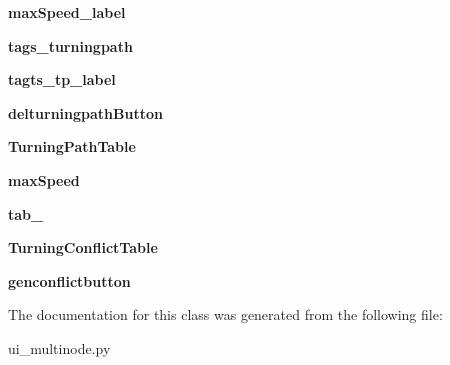 \begin{DoxyCompactItemize}
\item 
\hypertarget{class_sim_g_d_c_1_1ui__multinode_1_1_ui___multi_node_a846224a578369f377c62b30573e400e6}{}{\bfseries max\+Speed\+\_\+label}\label{class_sim_g_d_c_1_1ui__multinode_1_1_ui___multi_node_a846224a578369f377c62b30573e400e6}

\item 
\hypertarget{class_sim_g_d_c_1_1ui__multinode_1_1_ui___multi_node_afd095a589dac3d09e7a9cd0e7f3eed47}{}{\bfseries tags\+\_\+turningpath}\label{class_sim_g_d_c_1_1ui__multinode_1_1_ui___multi_node_afd095a589dac3d09e7a9cd0e7f3eed47}

\item 
\hypertarget{class_sim_g_d_c_1_1ui__multinode_1_1_ui___multi_node_a3b91ce20fbacbe119a208f5d817f9761}{}{\bfseries tagts\+\_\+tp\+\_\+label}\label{class_sim_g_d_c_1_1ui__multinode_1_1_ui___multi_node_a3b91ce20fbacbe119a208f5d817f9761}

\item 
\hypertarget{class_sim_g_d_c_1_1ui__multinode_1_1_ui___multi_node_aac8a7d8bc776b81981fb1c2fb878d87e}{}{\bfseries delturningpath\+Button}\label{class_sim_g_d_c_1_1ui__multinode_1_1_ui___multi_node_aac8a7d8bc776b81981fb1c2fb878d87e}

\item 
\hypertarget{class_sim_g_d_c_1_1ui__multinode_1_1_ui___multi_node_ae93fdb8c00ca50ce905a104ecd280c98}{}{\bfseries Turning\+Path\+Table}\label{class_sim_g_d_c_1_1ui__multinode_1_1_ui___multi_node_ae93fdb8c00ca50ce905a104ecd280c98}

\item 
\hypertarget{class_sim_g_d_c_1_1ui__multinode_1_1_ui___multi_node_a40737b5a4c7f8f06c8195c67163cf2dc}{}{\bfseries max\+Speed}\label{class_sim_g_d_c_1_1ui__multinode_1_1_ui___multi_node_a40737b5a4c7f8f06c8195c67163cf2dc}

\item 
\hypertarget{class_sim_g_d_c_1_1ui__multinode_1_1_ui___multi_node_a9f2b033c39196a09c361d8f942e96d08}{}{\bfseries tab\+\_}\label{class_sim_g_d_c_1_1ui__multinode_1_1_ui___multi_node_a9f2b033c39196a09c361d8f942e96d08}

\item 
\hypertarget{class_sim_g_d_c_1_1ui__multinode_1_1_ui___multi_node_abffeb1ba0841a4c0d17610746ea990ed}{}{\bfseries Turning\+Conflict\+Table}\label{class_sim_g_d_c_1_1ui__multinode_1_1_ui___multi_node_abffeb1ba0841a4c0d17610746ea990ed}

\item 
\hypertarget{class_sim_g_d_c_1_1ui__multinode_1_1_ui___multi_node_a5e892ecd1f70bf3d6ff251dec95d7a1d}{}{\bfseries genconflictbutton}\label{class_sim_g_d_c_1_1ui__multinode_1_1_ui___multi_node_a5e892ecd1f70bf3d6ff251dec95d7a1d}

\end{DoxyCompactItemize}


The documentation for this class was generated from the following file\+:\begin{DoxyCompactItemize}
\item 
ui\+\_\+multinode.\+py\end{DoxyCompactItemize}
